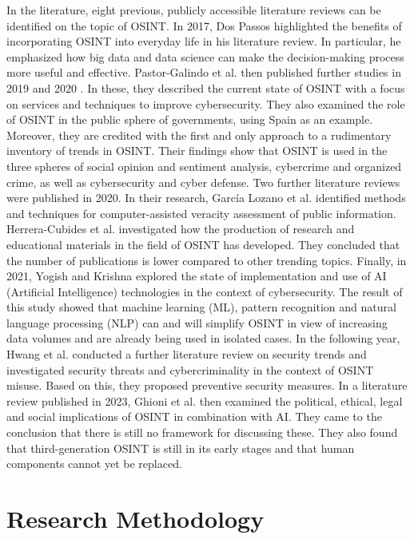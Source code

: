 \documentclass[10pt]{article}
\begin{document}
In the literature, eight previous, publicly accessible literature reviews can be identified
on the topic of OSINT. In 2017, Dos Passos \cite{DosPassos.2017} highlighted the benefits of
incorporating OSINT into everyday life in his literature review. In particular, he emphasized
how big data and data science can make the decision-making process more useful and effective.
Pastor-Galindo et al. then published further studies in 2019
\cite{PastorGalindo.2019} and 2020 \cite{PastorGalindo.2020}. In these, they described the
current state of OSINT with a focus on services and techniques to improve cybersecurity.
They also examined the role of OSINT in the public sphere of governments, using Spain as an
example. Moreover, they are credited with the first and only approach to a rudimentary
inventory of trends in OSINT. Their findings show that OSINT is used in the three spheres
of social opinion and sentiment analysis, cybercrime and organized crime, as well as
cybersecurity and cyber defense. Two further literature reviews were published in 2020.
In their research, García Lozano et al. \cite{GarciaLozano.2020} identified methods and
techniques for computer-assisted veracity assessment of public information.
Herrera-Cubides et al. \cite{HerreraCubides.2020} investigated how the production of
research and educational materials in the field of OSINT has developed. They concluded that
the number of publications is lower compared to other trending topics. Finally, in 2021,
Yogish and Krishna \cite{Yogish.2021} explored the state of implementation and use of AI
(Artificial Intelligence) technologies in the context of cybersecurity. The result of this
study showed that machine learning (ML), pattern recognition and natural language processing
(NLP) can and will simplify OSINT in view of increasing data volumes and are already being
used in isolated cases. In the following year, Hwang et al. \cite{Hwang.2022} conducted a
further literature review on security trends and investigated security threats and
cybercriminality in the context of OSINT misuse. Based on this, they proposed preventive
security measures. In a literature review published in 2023, Ghioni et al.
\cite{Ghioni.2023} then examined the political, ethical, legal and social implications of
OSINT in combination with AI. They came to the conclusion that there is still no framework
for discussing these. They also found that third-generation OSINT is still in its early
stages and that human components cannot yet be replaced.

\section{Research Methodology}
\end{document}
